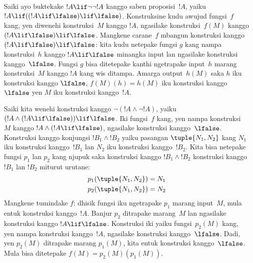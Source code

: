 \documentclass[../../../include/open-logic-section]{subfiles}
\begin{document}
\begin{ex}
Saiki ayo buktekake $!A \lif \lnot \lnot !A$ kanggo saben
proposisi~$!A$, yaiku $!A \lif ((!A \lif \lfalse) \lif \lfalse)$.
Konstruksine kudu awujud fungsi~$f$ kang, yen diwenehi konstruksi~$M$
kanggo $!A$, ngasilake konstruksi~$f(M)$ kanggo
$(!A \lif \lfalse) \lif \lfalse$. Mangkene carane~$f$ mbangun
konstruksi kanggo $(!A \lif \lfalse) \lif
\lfalse$: kita kudu netepake fungsi $g$ kang nampa konstruksi~$h$
kanggo $!A \lif \lfalse$ minangka input lan ngasilake konstruksi
kanggo~$\lfalse$. Fungsi $g$ bisa ditetepake kanthi ngetrapake
input~$h$ marang konstruksi~$M$ kanggo $!A$ kang wis ditampa.
Amarga output~$h(M)$ saka $h$ iku konstruksi kanggo $\lfalse$,
$f(M)(h) = h(M)$ iku konstruksi kanggo~$\lfalse$ yen $M$ iku
konstruksi kanggo~$!A$.
\end{ex}

\begin{ex}
Saiki kita wenehi konstruksi kanggo $\lnot(!A \land \lnot !A)$,
yaiku $(!A
\land (!A \lif \lfalse)) \lif \lfalse$. Iki fungsi~$f$ kang,
yen nampa konstruksi~$M$ kanggo $!A \land (!A \lif \lfalse)$,
ngasilake konstruksi kanggo~$\lfalse$. Konstruksi kanggo konjungsi
$!B_1 \land !B_2$ yaiku pasangan $\tuple{N_1, N_2}$ kang $N_1$
iku konstruksi kanggo~$!B_1$ lan $N_2$ iku konstruksi kanggo~$!B_2$.
Kita bisa netepake fungsi $p_1$ lan $p_2$ kang njupuk saka konstruksi
kanggo $!B_1 \land !B_2$ konstruksi kanggo $!B_1$ lan $!B_2$
miturut urutane:
\begin{align*}
  p_1(\tuple{N_1, N_2}) &= N_1\\
  p_2(\tuple{N_1, N_2}) &= N_2
\end{align*}
Mangkene tumindake $f$: dhisik fungsi iku ngetrapake $p_1$ marang
input~$M$, mula entuk konstruksi kanggo~$!A$. Banjur $p_2$
ditrapake marang~$M$ lan ngasilake konstruksi kanggo
$!A \lif \lfalse$. Konstruksi iki yaiku fungsi~$p_2(M)$ kang,
yen nampa konstruksi kanggo~$!A$, ngasilake konstruksi
kanggo~$\lfalse$. Dadi, yen $p_2(M)$ ditrapake marang $p_1(M)$,
kita entuk konstruksi kanggo~$\lfalse$. Mula bisa ditetepake
$f(M) = p_2(M)(p_1(M))$.
\end{ex}
\end{document}

